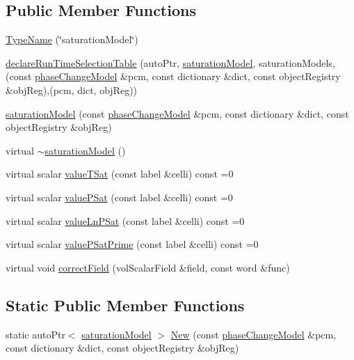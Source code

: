 \subsection*{Public Member Functions}
\begin{DoxyCompactItemize}
\item 
\hyperlink{classFoam_1_1saturationModel_a2a215f420d2477c10cc6566c95115624}{Type\+Name} (\char`\"{}saturation\+Model\char`\"{})
\item 
\hyperlink{classFoam_1_1saturationModel_a2921282189940dabd35f2dd037aca830}{declare\+Run\+Time\+Selection\+Table} (auto\+Ptr, \hyperlink{classFoam_1_1saturationModel}{saturation\+Model}, saturation\+Models,(const \hyperlink{classFoam_1_1phaseChangeModel}{phase\+Change\+Model} \&pcm, const dictionary \&dict, const object\+Registry \&obj\+Reg),(pcm, dict, obj\+Reg))
\item 
\hyperlink{classFoam_1_1saturationModel_a971e7ac30910c413f5424f76de0e04ed}{saturation\+Model} (const \hyperlink{classFoam_1_1phaseChangeModel}{phase\+Change\+Model} \&pcm, const dictionary \&dict, const object\+Registry \&obj\+Reg)
\item 
virtual \hyperlink{classFoam_1_1saturationModel_acfc67e88448a9c0641427cd8056c1064}{$\sim$saturation\+Model} ()
\item 
virtual scalar \hyperlink{classFoam_1_1saturationModel_aef8350cb17e8b8f92597160f1dd2a238}{value\+T\+Sat} (const label \&celli) const =0
\item 
virtual scalar \hyperlink{classFoam_1_1saturationModel_a20f0c2e04da2086bb7cbcdf3e2078e7f}{value\+P\+Sat} (const label \&celli) const =0
\item 
virtual scalar \hyperlink{classFoam_1_1saturationModel_a9b04e4a2fa5b275d1d5637c464b55ab4}{value\+Ln\+P\+Sat} (const label \&celli) const =0
\item 
virtual scalar \hyperlink{classFoam_1_1saturationModel_a2d5563aa609bea35032a40c7f766e48c}{value\+P\+Sat\+Prime} (const label \&celli) const =0
\item 
virtual void \hyperlink{classFoam_1_1saturationModel_afced535c7e4edc410c65206de603ef9c}{correct\+Field} (vol\+Scalar\+Field \&field, const word \&func)
\end{DoxyCompactItemize}
\subsection*{Static Public Member Functions}
\begin{DoxyCompactItemize}
\item 
static auto\+Ptr$<$ \hyperlink{classFoam_1_1saturationModel}{saturation\+Model} $>$ \hyperlink{classFoam_1_1saturationModel_a42778de81567ba32a8f004afce3aaf5a}{New} (const \hyperlink{classFoam_1_1phaseChangeModel}{phase\+Change\+Model} \&pcm, const dictionary \&dict, const object\+Registry \&obj\+Reg)
\end{DoxyCompactItemize}

